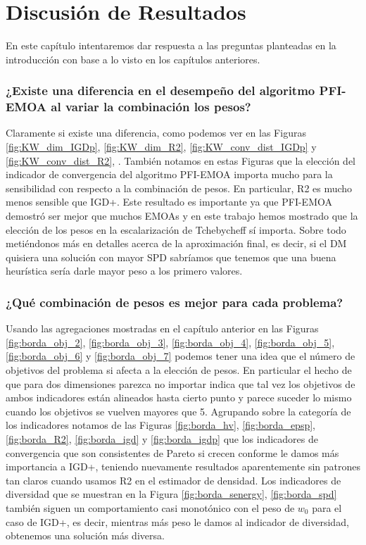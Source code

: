 \chapter{Discusión de Resultados}

En este capítulo intentaremos dar respuesta a las preguntas planteadas en la introducción con base a lo visto en los capítulos anteriores.

\subsection*{¿Existe una diferencia en el desempeño del algoritmo PFI-EMOA al variar la combinación los pesos?}

Claramente si existe una diferencia, como podemos ver en las Figuras \ref{fig:KW_dim_IGDp}, \ref{fig:KW_dim_R2}, \ref{fig:KW_conv_dist_IGDp} y \ref{fig:KW_conv_dist_R2}, . También notamos en estas Figuras que la elección del indicador de convergencia del algoritmo PFI-EMOA importa mucho para la sensibilidad con respecto a la combinación de pesos. En particular, R2 es mucho menos sensible que IGD+. Este resultado es importante ya que PFI-EMOA demostró ser mejor que muchos EMOAs  y en este trabajo hemos mostrado que la elección de los pesos en la escalarización de Tchebycheff sí importa. Sobre todo metiéndonos más en detalles acerca de la aproximación final, es decir, si el DM quisiera una solución con mayor SPD sabríamos que tenemos que una buena heurística sería darle mayor peso a los primero valores. 

\subsection*{¿Qué combinación de pesos es mejor para cada problema?}

Usando las agregaciones mostradas en el capítulo anterior en las Figuras \ref{fig:borda_obj_2}, \ref{fig:borda_obj_3}, \ref{fig:borda_obj_4}, \ref{fig:borda_obj_5}, \ref{fig:borda_obj_6} y \ref{fig:borda_obj_7} podemos tener una idea que el número de objetivos del problema si afecta a la elección de pesos. En particular el hecho de que para dos dimensiones parezca no importar indica que tal vez los objetivos de ambos indicadores están alineados hasta cierto punto y parece suceder lo mismo cuando los objetivos se vuelven mayores que 5. Agrupando sobre la categoría de los indicadores notamos de las Figuras \ref{fig:borda_hv}, \ref{fig:borda_epsp}, \ref{fig:borda_R2}, \ref{fig:borda_igd} y \ref{fig:borda_igdp}  que los indicadores de convergencia que son consistentes de Pareto si crecen conforme le damos más importancia a IGD+, teniendo nuevamente resultados aparentemente sin patrones tan claros cuando usamos R2 en el estimador de densidad. Los indicadores de diversidad que se muestran en la Figura \ref{fig:borda_senergy}, \ref{fig:borda_spd} también siguen un comportamiento casi monotónico con el peso de $w_0$ para el caso de IGD+, es decir, mientras más peso le damos al indicador de diversidad, obtenemos una solución más diversa. 

